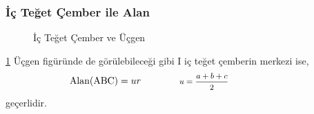 \subsubsection{İç Teğet Çember ile Alan}
\begin{figure}[h!]
    \centering
    \caption{İç Teğet Çember ve Üçgen}
    \label{fig:innertrig}
\end{figure}


\ref{fig:innertrig} Üçgen figüründe de görülebileceği gibi I iç teğet çemberin merkezi ise,
\begin{equation}
    \text{Alan(ABC)} = ur \qquad \qquad \parbox{4cm}{\footnotesize$\begin{aligned}
        u = \frac{a+b+c}{2}
    \end{aligned}$}
\end{equation}
geçerlidir.
